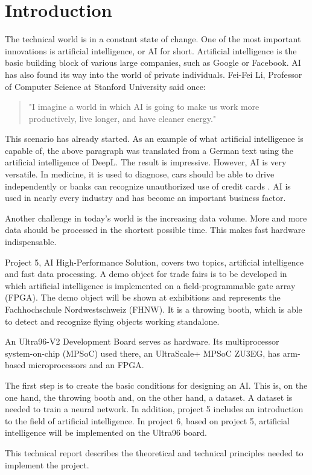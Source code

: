 \section{Introduction}
\label{sec:introduction}
The technical world is in a constant state of change. One of the most important innovations is artificial intelligence, or AI for short.
Artificial intelligence is the basic building block of various large companies, such as Google or Facebook.
AI has also found its way into the world of private individuals.
Fei-Fei Li, Professor of Computer Science at Stanford University said once:
\begin{quote}
	"I imagine a world in which AI is going to make us work more productively, live longer, and have cleaner energy."\cite{quotes_future}
\end{quote}
This scenario has already started. As an example of what artificial intelligence is capable of, the above paragraph was translated from a German text using the artificial intelligence of DeepL. The result is impressive.
However, AI is very versatile. In medicine, it is used to diagnose, cars should be able to drive independently or banks can recognize unauthorized use of credit cards \cite{artificial_intelligence_a_modern_approach}.
AI is used in nearly every industry and has become an important business factor.

Another challenge in today's world is the increasing data volume. More and more data should be processed in the shortest possible time. This makes fast hardware indispensable.

Project 5, AI High-Performance Solution, covers two topics, artificial intelligence and fast data processing.
A demo object for trade fairs is to be developed in which artificial intelligence is implemented on a field-programmable gate array (FPGA).
The demo object will be shown at exhibitions and represents the Fachhochschule Nordwestschweiz (FHNW).
It is a throwing booth, which is able to detect and recognize flying objects working standalone.

An Ultra96-V2 Development Board serves as hardware.
Its multiprocessor system-on-chip (MPSoC) used there, an UltraScale+ MPSoC ZU3EG, has arm-based microprocessors and an FPGA.

The first step is to create the basic conditions for designing an AI.
This is, on the one hand, the throwing booth and, on the other hand, a dataset. A dataset is needed to train a neural network.
In addition, project 5 includes an introduction to the field of artificial intelligence.
In project 6, based on project 5, artificial intelligence will be implemented on the Ultra96 board.

This technical report describes the theoretical and technical principles needed to implement the project.